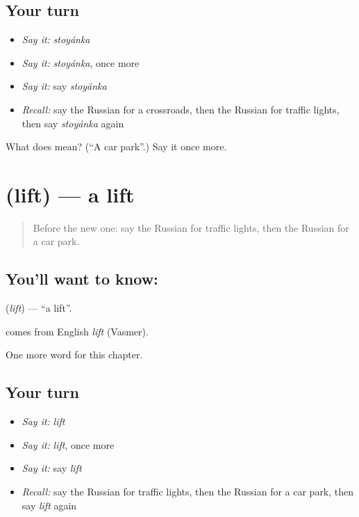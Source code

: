 \subsection*{Your turn}
\begin{itemize}
\raggedright
  \item \emph{Say it:} \emph{stoyánka}
  \item \emph{Say it:} \emph{stoyánka}, once more
  \item \emph{Say it:} say \emph{stoyánka}
  \item \emph{Recall:} say the Russian for a crossroads, then the Russian for traffic lights, then say \emph{stoyánka} again
\end{itemize}

\begin{tcolorbox}[breakable,colback=teal!4,colframe=teal!35!black,title={Before you move on}]
What does  mean? (\textquotedblleft{}A car park\textquotedblright{}.) Say it once more.
\end{tcolorbox}
\section[\texorpdfstring{\ru{лифт} (lift)}{лифт (lift)}]{ (lift) — a lift}

\label{lesson:RU-C90-lift}



\begin{quote}
Before the new one: say the Russian for traffic lights, then the Russian for a car park.
\end{quote}

\subsection*{You'll want to know: }
\textbf{} (\emph{lift}) — \textquotedblleft{}a lift\textquotedblright{}.

\begin{cousinweb}
\textbf{} comes from English \emph{lift} (Vasmer).
\end{cousinweb}

\begin{grammarlens}[title={What you've built}]
One more word for this chapter.
\end{grammarlens}

\subsection*{Your turn}
\begin{itemize}
\raggedright
  \item \emph{Say it:} \emph{lift}
  \item \emph{Say it:} \emph{lift}, once more
  \item \emph{Say it:} say \emph{lift}
  \item \emph{Recall:} say the Russian for traffic lights, then the Russian for a car park, then say \emph{lift} again
\end{itemize}

